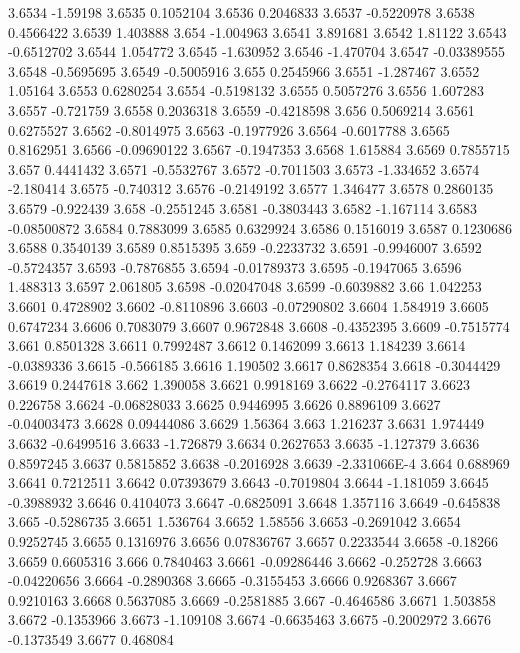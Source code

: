 3.6534  -1.59198
3.6535  0.1052104
3.6536  0.2046833
3.6537  -0.5220978
3.6538  0.4566422
3.6539  1.403888
3.654  -1.004963
3.6541  3.891681
3.6542  1.81122
3.6543  -0.6512702
3.6544  1.054772
3.6545  -1.630952
3.6546  -1.470704
3.6547  -0.03389555
3.6548  -0.5695695
3.6549  -0.5005916
3.655  0.2545966
3.6551  -1.287467
3.6552  1.05164
3.6553  0.6280254
3.6554  -0.5198132
3.6555  0.5057276
3.6556  1.607283
3.6557  -0.721759
3.6558  0.2036318
3.6559  -0.4218598
3.656  0.5069214
3.6561  0.6275527
3.6562  -0.8014975
3.6563  -0.1977926
3.6564  -0.6017788
3.6565  0.8162951
3.6566  -0.09690122
3.6567  -0.1947353
3.6568  1.615884
3.6569  0.7855715
3.657  0.4441432
3.6571  -0.5532767
3.6572  -0.7011503
3.6573  -1.334652
3.6574  -2.180414
3.6575  -0.740312
3.6576  -0.2149192
3.6577  1.346477
3.6578  0.2860135
3.6579  -0.922439
3.658  -0.2551245
3.6581  -0.3803443
3.6582  -1.167114
3.6583  -0.08500872
3.6584  0.7883099
3.6585  0.6329924
3.6586  0.1516019
3.6587  0.1230686
3.6588  0.3540139
3.6589  0.8515395
3.659  -0.2233732
3.6591  -0.9946007
3.6592  -0.5724357
3.6593  -0.7876855
3.6594  -0.01789373
3.6595  -0.1947065
3.6596  1.488313
3.6597  2.061805
3.6598  -0.02047048
3.6599  -0.6039882
3.66  1.042253
3.6601  0.4728902
3.6602  -0.8110896
3.6603  -0.07290802
3.6604  1.584919
3.6605  0.6747234
3.6606  0.7083079
3.6607  0.9672848
3.6608  -0.4352395
3.6609  -0.7515774
3.661  0.8501328
3.6611  0.7992487
3.6612  0.1462099
3.6613  1.184239
3.6614  -0.0389336
3.6615  -0.566185
3.6616  1.190502
3.6617  0.8628354
3.6618  -0.3044429
3.6619  0.2447618
3.662  1.390058
3.6621  0.9918169
3.6622  -0.2764117
3.6623  0.226758
3.6624  -0.06828033
3.6625  0.9446995
3.6626  0.8896109
3.6627  -0.04003473
3.6628  0.09444086
3.6629  1.56364
3.663  1.216237
3.6631  1.974449
3.6632  -0.6499516
3.6633  -1.726879
3.6634  0.2627653
3.6635  -1.127379
3.6636  0.8597245
3.6637  0.5815852
3.6638  -0.2016928
3.6639  -2.331066E-4
3.664  0.688969
3.6641  0.7212511
3.6642  0.07393679
3.6643  -0.7019804
3.6644  -1.181059
3.6645  -0.3988932
3.6646  0.4104073
3.6647  -0.6825091
3.6648  1.357116
3.6649  -0.645838
3.665  -0.5286735
3.6651  1.536764
3.6652  1.58556
3.6653  -0.2691042
3.6654  0.9252745
3.6655  0.1316976
3.6656  0.07836767
3.6657  0.2233544
3.6658  -0.18266
3.6659  0.6605316
3.666  0.7840463
3.6661  -0.09286446
3.6662  -0.252728
3.6663  -0.04220656
3.6664  -0.2890368
3.6665  -0.3155453
3.6666  0.9268367
3.6667  0.9210163
3.6668  0.5637085
3.6669  -0.2581885
3.667  -0.4646586
3.6671  1.503858
3.6672  -0.1353966
3.6673  -1.109108
3.6674  -0.6635463
3.6675  -0.2002972
3.6676  -0.1373549
3.6677  0.468084
